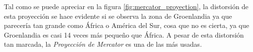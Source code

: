         Tal como se puede apreciar en la figura \ref{fig:mercator_proyection}, la distorsión de esta proyección se hace evidente si se observa la zona de Groenlandia ya que parecería tan grande como África o América del Sur, cosa que no es cierta, ya que Groenlandia es casi 14 veces más pequeño que África. A pesar de esta distorsión tan marcada, la \emph{Proyección de Mercator} es una de las más usadas.

